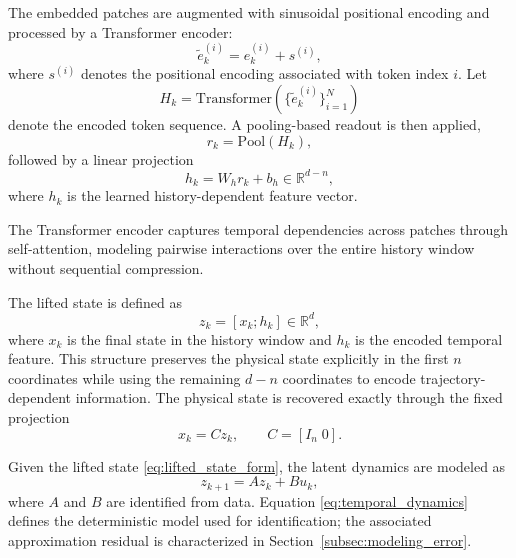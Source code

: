 \documentclass[journal]{IEEEtran}
\begin{document}
The embedded patches are augmented with sinusoidal positional encoding and processed by a Transformer encoder:
\begin{equation}
    \tilde{e}_k^{(i)} = e_k^{(i)} + s^{(i)},
\end{equation}
where $s^{(i)}$ denotes the positional encoding associated with token index $i$. Let
\begin{equation}
    H_k = \mathrm{Transformer}\!\left(\bigl\{\tilde{e}_k^{(i)}\bigr\}_{i=1}^N\right)
    \label{eq:transformer_enc}
\end{equation}
denote the encoded token sequence. A pooling-based readout is then applied,
\begin{equation}
    r_k = \mathrm{Pool}(H_k),
\end{equation}
followed by a linear projection
\begin{equation}
    h_k = W_h r_k + b_h \in \mathbb{R}^{d-n},
    \label{eq:history_feature}
\end{equation}
where $h_k$ is the learned history-dependent feature vector.

The Transformer encoder captures temporal dependencies across patches through self-attention, modeling pairwise interactions over the entire history window without sequential compression.

The lifted state is defined as
\begin{equation}
    z_k = [x_k;h_k] \in \mathbb{R}^{d},
    \label{eq:lifted_state_form}
\end{equation}
where $x_k$ is the final state in the history window and $h_k$ is the encoded temporal feature. This structure preserves the physical state explicitly in the first $n$ coordinates while using the remaining $d-n$ coordinates to encode trajectory-dependent information. The physical state is recovered exactly through the fixed projection
\begin{equation}
    x_k = C z_k, \qquad C = [I_n\;0].
    \label{eq:decoder_projection}
\end{equation}

Given the lifted state \eqref{eq:lifted_state_form}, the latent dynamics are modeled as
\begin{equation}
    z_{k+1} = A z_k + B u_k,
    \label{eq:temporal_dynamics}
\end{equation}
where $A$ and $B$ are identified from data. Equation \eqref{eq:temporal_dynamics} defines the deterministic model used for identification; the associated approximation residual is characterized in Section~\ref{subsec:modeling_error}.
\end{document}
